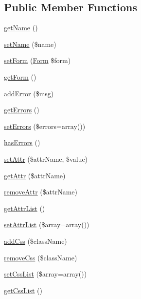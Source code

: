 \subsection*{Public Member Functions}
\begin{DoxyCompactItemize}
\item 
\hyperlink{classTk_1_1Form_1_1Element_ab2d444b43ec4898f0e7c3a820166361d}{get\+Name} ()
\item 
\hyperlink{classTk_1_1Form_1_1Element_a3be96916f13d347b9302b617ab70433c}{set\+Name} (\$name)
\item 
\hyperlink{classTk_1_1Form_1_1Element_a21676e35649e65aa1b25ac9650574791}{set\+Form} (\hyperlink{classTk_1_1Form}{Form} \$form)
\item 
\hyperlink{classTk_1_1Form_1_1Element_aebd859aa21a08ff2c853192d001ae854}{get\+Form} ()
\item 
\hyperlink{classTk_1_1Form_1_1Element_a44f96cdf51bb9fb1d0669ec1e5e3d391}{add\+Error} (\$msg)
\item 
\hyperlink{classTk_1_1Form_1_1Element_a28df7771e8ea01ab0d22155bf6e2d3f3}{get\+Errors} ()
\item 
\hyperlink{classTk_1_1Form_1_1Element_acc67fc16d36fdbb12112ea9635bef8d1}{set\+Errors} (\$errors=array())
\item 
\hyperlink{classTk_1_1Form_1_1Element_a0a8bca514435d24b95ca130a7d60d620}{has\+Errors} ()
\item 
\hyperlink{classTk_1_1Form_1_1Element_ad6daa5550f7be509ebd18e76c5365835}{set\+Attr} (\$attr\+Name, \$value)
\item 
\hyperlink{classTk_1_1Form_1_1Element_a51146497c5762879c4cdcb91ce0f3f9e}{get\+Attr} (\$attr\+Name)
\item 
\hyperlink{classTk_1_1Form_1_1Element_afe86ad6d478822dc54d6b0236364fe8a}{remove\+Attr} (\$attr\+Name)
\item 
\hyperlink{classTk_1_1Form_1_1Element_a0500123e165f8ea1d2088182f06d5593}{get\+Attr\+List} ()
\item 
\hyperlink{classTk_1_1Form_1_1Element_afcb2c07dc89c8c09bde82dd47fae2229}{set\+Attr\+List} (\$array=array())
\item 
\hyperlink{classTk_1_1Form_1_1Element_a68c5472ae89051f4ed159085949cd244}{add\+Css} (\$class\+Name)
\item 
\hyperlink{classTk_1_1Form_1_1Element_ac966da5b6d3e94e26fb611987de83483}{remove\+Css} (\$class\+Name)
\item 
\hyperlink{classTk_1_1Form_1_1Element_a1414fbd5a4cc6a12c7af1bf53e6720c5}{set\+Css\+List} (\$array=array())
\item 
\hyperlink{classTk_1_1Form_1_1Element_aefb70f35a6c60faf1c33e6df2b4ffe53}{get\+Css\+List} ()
\end{DoxyCompactItemize}
